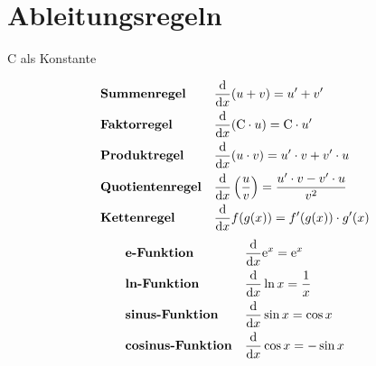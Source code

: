 \documentclass{article}
\begin{document}
\section{Ableitungsregeln}
$\mathrm{C}$ als Konstante 
\begin{multicols}{2} 
 \noindent \begin{align*}
  &\text{\textbf{Summenregel}} &&\frac{\mathrm{d}}{\mathrm{d}x} (u + v) = u' + v' \\
  &\text{\textbf{Faktorregel}} &&\frac{\mathrm{d}}{\mathrm{d}x} (\mathrm{C} \cdot u) = \mathrm{C} \cdot u' \\  
  &\text{\textbf{Produktregel}} &&\frac{\mathrm{d}}{\mathrm{d}x} (u \cdot v) = u' \cdot v + v' \cdot u \\
  &\text{\textbf{Quotientenregel}} &&\frac{\mathrm{d}}{\mathrm{d}x} \left( \frac{u}{v} \right) = \frac{u' \cdot v - v' \cdot u}{v^2} \\
 &\text{\textbf{Kettenregel}} &&\frac{\mathrm{d}}{\mathrm{d}x} f(g(x)) = f'(g(x)) \cdot g'(x) \\
 \end{align*} 
 \begin{align*}
  &\text{\textbf{e-Funktion}} &&\frac{\mathrm{d}}{\mathrm{d}x} \mathrm{e}^x = \mathrm{e}^x \\
  &\text{\textbf{ln-Funktion}} &&\frac{\mathrm{d}}{\mathrm{d}x} \ln x = \frac{1}{x} \\
  &\text{\textbf{sinus-Funktion}} &&\frac{\mathrm{d}}{\mathrm{d}x} \sin x = \cos x \\
  &\text{\textbf{cosinus-Funktion}} &&\frac{\mathrm{d}}{\mathrm{d}x} \cos x = -\sin x
 \end{align*} 
\end{multicols} 
\end{document}
